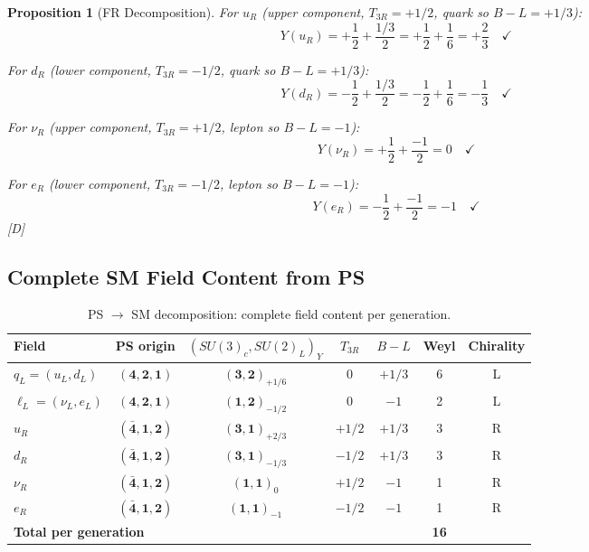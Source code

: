 \documentclass[11pt,a4paper]{article}
\newtheorem{proposition}[theorem]{Proposition}
\newcommand{\tagD}{\textcolor{blue!70!black}{[D]}}
\begin{document}
\begin{proposition}[FR Decomposition]
For $u_R$ (upper component, $T_{3R} = +1/2$, quark so $B-L = +1/3$):
\begin{equation}
\label{eq:Y-uR-calc}
Y(u_R) = +\frac{1}{2} + \frac{1/3}{2} = +\frac{1}{2} + \frac{1}{6} = +\frac{2}{3} \quad \checkmark
\end{equation}

For $d_R$ (lower component, $T_{3R} = -1/2$, quark so $B-L = +1/3$):
\begin{equation}
\label{eq:Y-dR-calc}
Y(d_R) = -\frac{1}{2} + \frac{1/3}{2} = -\frac{1}{2} + \frac{1}{6} = -\frac{1}{3} \quad \checkmark
\end{equation}

For $\nu_R$ (upper component, $T_{3R} = +1/2$, lepton so $B-L = -1$):
\begin{equation}
\label{eq:Y-nuR-calc}
Y(\nu_R) = +\frac{1}{2} + \frac{-1}{2} = 0 \quad \checkmark
\end{equation}

For $e_R$ (lower component, $T_{3R} = -1/2$, lepton so $B-L = -1$):
\begin{equation}
\label{eq:Y-eR-calc}
Y(e_R) = -\frac{1}{2} + \frac{-1}{2} = -1 \quad \checkmark
\end{equation}
\tagD
\end{proposition}

\subsection{Complete SM Field Content from PS}

\begin{table}[h]
\centering
\caption{PS $\to$ SM decomposition: complete field content per generation.}
\label{tab:ps-sm-fields}
\begin{tabular}{lcccccc}
\toprule
Field & PS origin & $(SU(3)_c, SU(2)_L)_Y$ & $T_{3R}$ & $B-L$ & Weyl & Chirality \\
\midrule
$q_L = (u_L, d_L)$ & $(\mathbf{4}, \mathbf{2}, \mathbf{1})$ & $(\mathbf{3}, \mathbf{2})_{+1/6}$ & 0 & $+1/3$ & 6 & L \\
$\ell_L = (\nu_L, e_L)$ & $(\mathbf{4}, \mathbf{2}, \mathbf{1})$ & $(\mathbf{1}, \mathbf{2})_{-1/2}$ & 0 & $-1$ & 2 & L \\
\midrule
$u_R$ & $(\bar{\mathbf{4}}, \mathbf{1}, \mathbf{2})$ & $(\mathbf{3}, \mathbf{1})_{+2/3}$ & $+1/2$ & $+1/3$ & 3 & R \\
$d_R$ & $(\bar{\mathbf{4}}, \mathbf{1}, \mathbf{2})$ & $(\mathbf{3}, \mathbf{1})_{-1/3}$ & $-1/2$ & $+1/3$ & 3 & R \\
$\nu_R$ & $(\bar{\mathbf{4}}, \mathbf{1}, \mathbf{2})$ & $(\mathbf{1}, \mathbf{1})_{0}$ & $+1/2$ & $-1$ & 1 & R \\
$e_R$ & $(\bar{\mathbf{4}}, \mathbf{1}, \mathbf{2})$ & $(\mathbf{1}, \mathbf{1})_{-1}$ & $-1/2$ & $-1$ & 1 & R \\
\midrule
\multicolumn{5}{l}{\textbf{Total per generation}} & \textbf{16} & \\
\bottomrule
\end{tabular}
\end{table}
\end{document}
